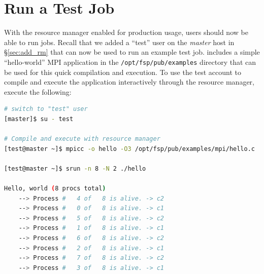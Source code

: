 \documentclass[letterpaper]{article}
\begin{document}
\section{Run a Test Job}

With the resource manager enabled for production usage, users should now be
able to run jobs. 
Recall that we added a ``test'' user on the {\em master} host in
\S\ref{sec:add_rm} that can now be used to run an example test job.  \FSP{}
includes a simple ``hello-world'' MPI application in the
\texttt{/opt/fsp/pub/examples} directory that can be used for this quick
compilation and execution.  To use the test account to compile and execute the 
application interactively through the resource manager, execute the following:

\begin{lstlisting}[language=bash,keywords={}]
# switch to "test" user
[master]$ su - test

# Compile and execute with resource manager
[test@master ~]$ mpicc -o hello -O3 /opt/fsp/pub/examples/mpi/hello.c

[test@master ~]$ srun -n 8 -N 2 ./hello

Hello, world (8 procs total)
    --> Process #   4 of   8 is alive. -> c2
    --> Process #   0 of   8 is alive. -> c1
    --> Process #   5 of   8 is alive. -> c2
    --> Process #   1 of   8 is alive. -> c1
    --> Process #   6 of   8 is alive. -> c2
    --> Process #   2 of   8 is alive. -> c1
    --> Process #   7 of   8 is alive. -> c2
    --> Process #   3 of   8 is alive. -> c1
\end{lstlisting}



\end{document}

